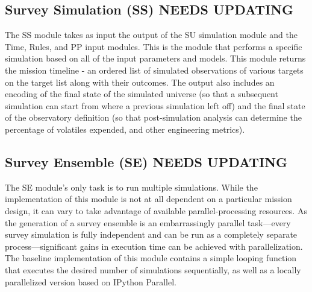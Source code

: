 \documentclass[cleanfoot]{asme2ej}
\begin{document}

\subsection{Survey Simulation (SS) NEEDS UPDATING}
The SS module takes as input the output of the SU simulation module and the Time, Rules, and PP input modules. This is the module that performs a specific simulation based on all of the input parameters and models. This module returns the mission timeline - an ordered list of simulated observations of various targets on the target list along with their outcomes.  The output also includes an encoding of the final state of the simulated universe (so that a subsequent simulation can start from where a previous simulation left off) and the final state of the observatory definition (so that post-simulation analysis can determine the percentage of volatiles expended, and other engineering metrics).


\subsection{Survey Ensemble (SE) NEEDS UPDATING}
The SE module's only task is to run multiple simulations.  While the implementation of this module is not at all dependent on a particular mission design, it can vary to take advantage of available parallel-processing resources.  As the generation of a survey ensemble is an embarrassingly parallel task---every survey simulation is fully independent and can be run as a completely separate process---significant gains in execution time can be achieved with parallelization.  The baseline implementation of this module contains a simple looping function that executes the desired number of simulations sequentially, as well as a locally parallelized version based on IPython Parallel.
\end{document}

